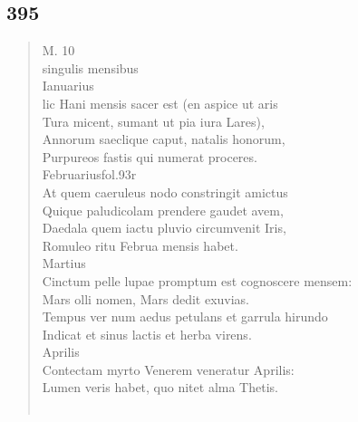 \documentclass[11pt, a4paper]{report}
\begin{document}
            \subsection*{395}
      \begin{verse}
      M. 10 \\ singulis mensibus \\ Ianuarius \\ lic Hani mensis sacer est (en aspice ut aris \\ Tura micent, sumant ut pia iura Lares), \\ Annorum saeclique caput, natalis honorum, \\ Purpureos fastis qui numerat proceres. \\ Februariusfol.93r \\ At quem caeruleus nodo constringit amictus \\ Quique paludicolam prendere gaudet avem, \\ Daedala quem iactu pluvio circumvenit Iris, \\ Romuleo ritu Februa mensis habet. \\ Martius \\ Cinctum pelle lupae promptum est cognoscere mensem: \\ Mars olli nomen, Mars dedit exuvias. \\ Tempus ver \lbrack num \rbrack  aedus petulans et garrula hirundo \\ Indicat et sinus lactis et herba virens. \\ Aprilis \\ Contectam myrto Venerem veneratur Aprilis: \\ Lumen veris habet, quo nitet alma Thetis. \\ 
        ﻿\pagebreak 
    
      \end{verse}
  
\end{document}
